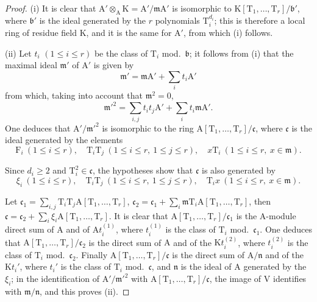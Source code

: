 \begin{proof}
(i) It is clear that $\mathrm{A}'\otimes_\mathrm{A}\mathrm{K}=\mathrm{A}'/\mathfrak{m}\mathrm{A}'$ is isomorphic to $\mathrm{K}[\mathrm{T}_1,\ldots,\mathrm{T}_r]/\mathfrak{b}'$, where $\mathfrak{b}'$ is the ideal generated by the $r$ polynomials $\mathrm{T}_i^{d_i}$; this is therefore a local ring of residue field $\mathrm{K}$, and it is the same for $\mathrm{A}'$, from which (i) follows.

(ii) Let $t_i$ $(1\leq i\leq r)$ be the class of $\mathrm{T}_i$ mod.~$\mathfrak{b}$; it follows from (i) that the maximal ideal $\mathfrak{m}'$ of $\mathrm{A}'$ is given by
\[
  \mathfrak{m}'=\mathfrak{m}\mathrm{A}'+\sum_i t_i\mathrm{A}'
\]
from which, taking into account that $\mathfrak{m}^2=0$,
\[
  \mathfrak{m}'^2=\sum_{i,j}t_it_j\mathrm{A}'+\sum_i t_i\mathfrak{m}\mathrm{A}'.
\]
One deduces that $\mathrm{A}'/\mathfrak{m}'^2$ is isomorphic to the ring $\mathrm{A}[\mathrm{T}_1,\ldots,\mathrm{T}_r]/\mathfrak{c}$, where $\mathfrak{c}$ is the ideal generated by the elements
\[
  \mathrm{F}_i\ (1\leq i\leq r),\quad \mathrm{T}_i\mathrm{T}_j\ (1\leq i\leq r,\ 1\leq j\leq r),\quad x\mathrm{T}_i\ (1\leq i\leq r,\ x\in\mathfrak{m}).
\]

Since $d_i\geq 2$ and $\mathrm{T}_i^2\in\mathfrak{c}$, the hypotheses show that $\mathfrak{c}$ is also generated by
\[
  \xi_i\ (1\leq i\leq r),\quad \mathrm{T}_i\mathrm{T}_j\ (1\leq i\leq r,\ 1\leq j\leq r),\quad \mathrm{T}_i x\ (1\leq i\leq r,\ x\in\mathfrak{m}).
\]

Let $\mathfrak{c}_1=\sum_{i,j}\mathrm{T}_i\mathrm{T}_j\mathrm{A}[\mathrm{T}_1,\ldots,\mathrm{T}_r]$, $\mathfrak{c}_2=\mathfrak{c}_1+\sum_i\mathfrak{m}\mathrm{T}_i\mathrm{A}[\mathrm{T}_1,\ldots,\mathrm{T}_r]$, then $\mathfrak{c}=\mathfrak{c}_2+\sum_i\xi_i\mathrm{A}[\mathrm{T}_1,\ldots,\mathrm{T}_r]$.
It is clear that $\mathrm{A}[\mathrm{T}_1,\ldots,\mathrm{T}_r]/\mathfrak{c}_1$ is the $\mathrm{A}$-module direct sum of $\mathrm{A}$ and of $\mathrm{A}t_i^{(1)}$, where $t_i^{(1)}$ is the class of $\mathrm{T}_i$ mod.~$\mathfrak{c}_1$.
One deduces that $\mathrm{A}[\mathrm{T}_1,\ldots,\mathrm{T}_r]/\mathfrak{c}_2$ is the direct sum of $\mathrm{A}$ and of the $\mathrm{K}t_i^{(2)}$, where $t_i^{(2)}$ is the class of $\mathrm{T}_i$ mod.~$\mathfrak{c}_2$.
Finally $\mathrm{A}[\mathrm{T}_1,\ldots,\mathrm{T}_r]/\mathfrak{c}$ is the direct sum of $\mathrm{A}/\mathfrak{n}$ and of the $\mathrm{K}t_i'$, where $t_i'$ is the class of $\mathrm{T}_i$ mod.~$\mathfrak{c}$, and $\mathfrak{n}$ is the ideal of $\mathrm{A}$ generated by the $\xi_i$; in the identification of $\mathrm{A}'/\mathfrak{m}'^2$ with $\mathrm{A}[\mathrm{T}_1,\ldots,\mathrm{T}_r]/\mathfrak{c}$, the image of $\mathrm{V}$ identifies with $\mathfrak{m}/\mathfrak{n}$, and this proves (ii).
\end{proof}

